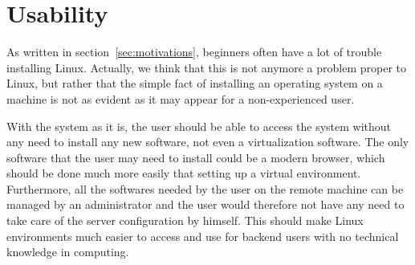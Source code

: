\section{Usability}
%
As written in section~\ref{sec:motivations}, beginners often have a lot of trouble 
installing Linux. Actually, we think that this is not anymore a problem proper to Linux, 
but rather that the simple fact of installing an operating system on a machine is not 
as evident as it may appear for a non-experienced user.

With the system as it is, the user should be able to access the system without 
any need to install any new software, not even a virtualization software. The only 
software that the user may need to install could be a modern browser, which 
should be done much more easily that setting up a virtual environment. Furthermore, 
all the softwares needed by the user on the remote machine can be managed by 
an administrator and the user would therefore not have any need to take care of the 
server configuration by himself. This should make Linux environments much easier 
to access and use for backend users with no technical knowledge in computing.